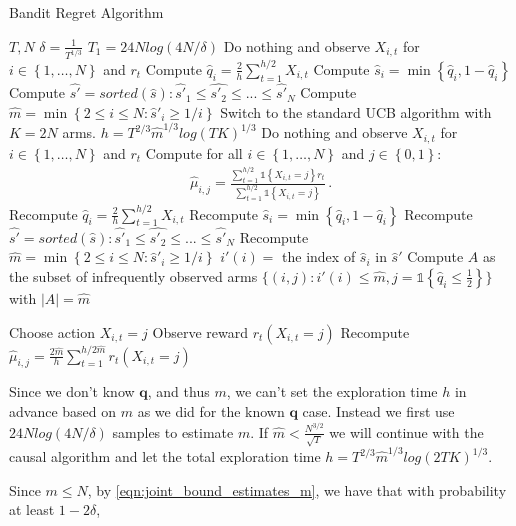 \documentclass{article}
\newcommand{\set}[1]{\left\{#1\right\}}
\newcommand{\ind}[1]{\mathds{1}\!\!\set{#1}}
\newcommand{\eq}[1]{\begin{align*}#1\end{align*}}
\theoremstyle{plain}
\theoremstyle{definition}
\begin{document}
\begin{algorithm}[H]
\caption{Bandit Regret Algorithm}\label{alg:bandit}
\begin{algorithmic}[1]
 $T, N$
\State $\delta = \frac{1}{T^{1/3}}$ 
\State $T_1 = 24Nlog\left(4N/\delta\right)$ 
\State Do nothing and observe $X_{i,t}$ for $i \in \set{1,\ldots,N}$ and $r_t$
\EndFor
\State Compute $\hat q_i = \frac{2}{h} \sum_{t=1}^{h/2} X_{i,t}$
\State Compute $\hat s_i = \min\set{\hat q_i, 1 - \hat q_i}$
\State Compute $\hat{s'} = sorted(\hat{s}) : \hat{s'}_1 \leq \hat{s'_2} \leq ... \leq \hat{s'}_N$
\State Compute $\hat m = \min\set{2 \leq i \leq N : \hat s'_{i} \geq 1/i}$
\State Switch to the standard UCB algorithm with $K = 2N$ arms.
\Else
\State $h = T^{2/3}\hat{m}^{1/3}log(TK)^{1/3}$ 
\State Do nothing and observe $X_{i,t}$ for $i \in \set{1,\ldots,N}$ and $r_t$
\EndFor
\State Compute for all $i \in \set{1,\ldots,N}$ and $j \in \set{0,1}$:
\eq{
\hat \mu_{i,j} = \frac{\sum_{t=1}^{h/2} \ind{X_{i,t} = j} r_t}{\sum_{t=1}^{h/2} \ind{X_{i,t} = j}}\,.
}
\State Recompute $\hat q_i = \frac{2}{h} \sum_{t=1}^{h/2} X_{i,t}$
\State Recompute $\hat s_i = \min\set{\hat q_i, 1 - \hat q_i}$
\State Recompute $\hat{s'} = sorted(\hat{s}) : \hat{s'}_1 \leq \hat{s'_2} \leq ... \leq \hat{s'}_N$
\State Recompute $\hat m = \min\set{2 \leq i \leq N : \hat s'_{i} \geq 1/i}$
\State $i'(i) = $ the index of $\hat s_i$ in $\hat s'$
\State Compute $A$ as the subset of infrequently observed arms $\{(i,j):i'(i) \leq \hat m, j = \ind{\hat q_{i} \leq \frac{1}{2}} \}$ with $|A| = \hat m$

\State Choose action $X_{i,t} = j$
\State Observe reward $r_t(X_{i,t}=j)$
\EndFor
\State Recompute $\hat \mu_{i,j} = \frac{2\hat m}{h} \sum_{t=1}^{ h/2\hat m} r_t(X_{i,t}=j)$ 
\EndFor
\EndIf
\end{algorithmic}
\end{algorithm}


Since we don't know $\boldsymbol{q}$, and thus $m$, we can't set the exploration time $h$ in advance based on $m$ as we did for the known $\boldsymbol{q}$ case. Instead we first use $24Nlog(4N/\delta)$ samples to estimate $m$. If $\hat m < \frac{N^{3/2}}{\sqrt{T}}$ we will continue with the causal algorithm and let the total exploration time $h = T^{2/3}\hat{m}^{1/3}log(2TK)^{1/3}$. 




Since $m \leq N$, by \cref{eqn:joint_bound_estimates_m}, we have that with probability at least $1-2\delta$, 
\end{document}
